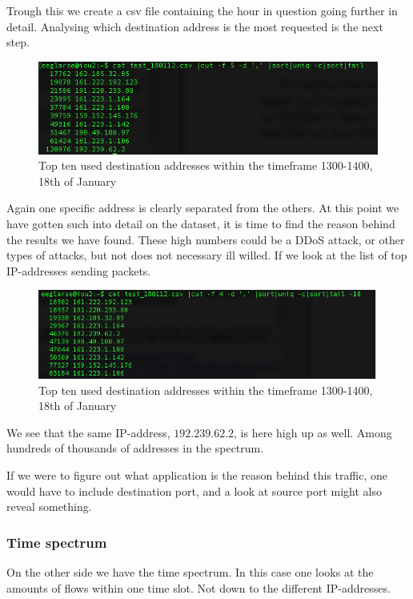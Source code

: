 Trough this we create a csv file containing the hour in question going further in detail.
Analysing which destination address is the most requested is the next step. 

\begin{figure}
\includegraphics[scale=0.6]{ip_top_list}
\caption{Top ten used destination addresses within the timeframe 1300-1400, 18th of January}
\end{figure}

Again one specific address is clearly separated from the others. At this point we have gotten such into detail on the dataset, it is time to find the reason behind the results we have found. 
These high numbers could be a DDoS attack, or other types of attacks, but not does not necessary ill willed. If we look at the list of top IP-addresses sending packets.
\begin{figure}
\includegraphics[scale=0.6]{top10_sa}
\caption{Top ten used destination addresses within the timeframe 1300-1400, 18th of January}
\end{figure}

We see that the same IP-address, $192.239.62.2$, is here high up as well. Among hundreds of thousands of addresses in the spectrum. 

If we were to figure out what application is the reason behind this traffic, one would have to include destination port, and a look at source port might also reveal something. 


\subsubsection{Time spectrum}
On the other side we have the time spectrum. In this case one looks at the amounts of flows within one time slot. Not down to the different IP-addresses. 

